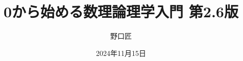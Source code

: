 \documentclass[10pt, a5j, ]{ltjsbook} %
\theoremstyle{definition}
\renewcommand{\presectionname}{\S}
\newcommand{\presubsectionname}{\S\S}
\begin{document}
\begin{titlepage}
	\title{0から始める数理論理学入門 第2.6版}
	\author{野口匠}
	\date{2024年11月15日}
	\maketitle
\end{titlepage}

\frontmatter



\tableofcontents

\mainmatter








\backmatter

\RenewDocumentCommand{\presectionname}{}{}
\RenewDocumentCommand{\presubsectionname}{}{}


\nocite{*}
\printbibliography[title=参考文献, heading=bibintoc]

\printindex[sidx]
\printindex[widx]

\newpage
\pagestyle{empty}
~
\newpage


\end{document}
